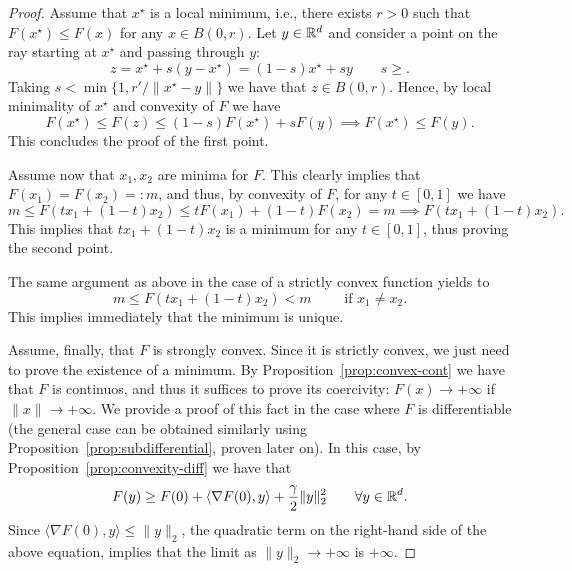 \documentclass{report}
\begin{document}
	\begin{proof}
		Assume that $x^\star$ is a local minimum, i.e., there exists $r>0$ such that $F(x^\star)\le F(x)$ for any $x\in B(0,r)$. 
		Let $y\in \mathbb{R}^d$ and consider a point on the ray starting at $x^\star$ and passing through $y$:
		\begin{equation}
		z = x^\star + s (y-x^\star) =   (1-s)x^\star + s y\qquad s\ge.
		\end{equation}
		Taking $s < \min\{1, r'/\|x^\star - y\|\}$ we have that $z\in B(0,r)$. Hence, by local minimality of $x^\star$ and convexity of $F$ we have
		\begin{equation}
			F(x^\star) \le F(z) \le (1-s)F(x^\star) + s F(y) \implies F(x^\star) \le F(y).
		\end{equation}
		This concludes the proof of the first point.

		Assume now that $x_1,x_2$ are minima for $F$. This clearly implies that $F(x_1)=F(x_2) =: m$, and thus, by convexity of $F$, for any $t\in [0,1]$ we have
		\begin{equation}
			m \le F(t x_1 + (1-t)x_2) \le t F(x_1) +(1-t) F(x_2) = m \implies F(t x_1 + (1-t)x_2).
		\end{equation}
		This implies that $t x_1 + (1-t)x_2$ is a minimum for any $t\in [0,1]$, thus proving the second point.
		
		The same argument as above in the case of a strictly convex function yields to
		\begin{equation}
			m \le F(tx_1+(1-t)x_2) < m \qquad \text{ if } x_1\neq x_2.
		\end{equation}
		This implies immediately that the minimum is unique.
	
		Assume, finally, that $F$ is strongly convex. Since it is strictly convex, we just need to prove the existence of a minimum. 
		By Proposition~\ref{prop:convex-cont} we have that $F$ is continuos, and thus it suffices to prove its coercivity: $F(x)\to +\infty$ if $\|x\|\to +\infty$. 
		We provide a proof of this fact in the case where $F$ is differentiable (the general case can be obtained similarly using Proposition~\ref{prop:subdifferential}, proven later on). In this case, by Proposition~\ref{prop:convexity-diff} we have that 
		\begin{equation}
			F(y) \ge F(0)+\langle \nabla F(0),y\rangle +\frac\gamma2\|y\|_2^2 \qquad \forall y\in \mathbb{R}^d.
		\end{equation}
		Since $\langle \nabla F(0),y\rangle \le \|y\|_2$, the quadratic term on the right-hand side of the above equation, implies that the limit as $\|y\|_2\to +\infty$ is $+\infty$.
	\end{proof}
\end{document}

